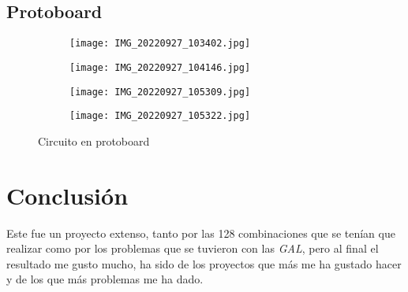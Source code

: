 \documentclass[12pt, oneside, openany]{article}
\begin{document}
\newpage
\subsection{Protoboard}
\begin{figure}[h!]
    \centering
    
    \begin{subfigure}[tl]{0.45\textwidth}
        \centering
        \texttt{[image: IMG\_20220927\_103402.jpg]}
    \end{subfigure}
    \begin{subfigure}[tr]{0.45\textwidth}
        \centering
        \texttt{[image: IMG\_20220927\_104146.jpg]}
    \end{subfigure}
    \begin{subfigure}[bl]{0.45\textwidth}
        \centering
        \texttt{[image: IMG\_20220927\_105309.jpg]}
    \end{subfigure}
    \begin{subfigure}[br]{0.45\textwidth}
        \centering
        \texttt{[image: IMG\_20220927\_105322.jpg]}
    \end{subfigure}
    
    \caption{\sffamily Circuito en protoboard}
    \label{fig:proto}
\end{figure}

\section{Conclusión}
{\sffamily\large
    \hspace{0.5cm} Este fue un proyecto extenso, tanto por las 128 combinaciones que se tenían que realizar como por los problemas que se tuvieron con las \emph{GAL}, pero al final el resultado me gusto mucho, ha sido de los proyectos que más me ha gustado hacer y de los que más problemas me ha dado.
}
    
\end{document}

